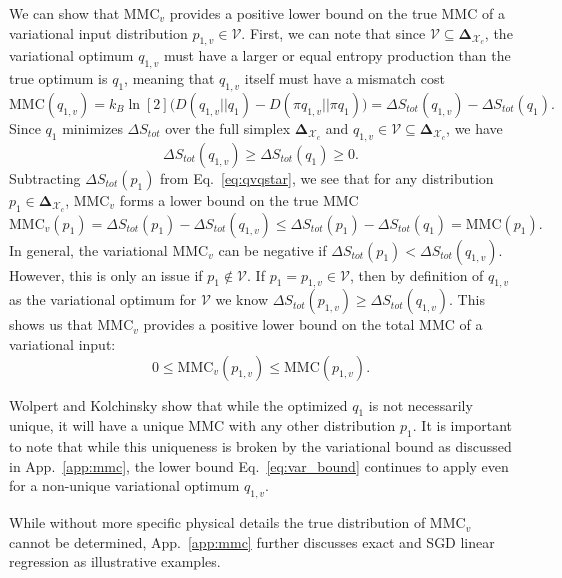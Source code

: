 \documentclass[12pt,onecolumn, margin=1in]{IEEEtran}
\newcommand{\compsimplex}{\boldsymbol{\Delta}_{\mathcal{X}_c}}
\begin{document}
We can show that MMC$_v$ provides a positive lower bound on the true MMC of a variational input distribution $p_{1,v} \in \mathcal{V}$. First, we can note that since $\mathcal{V} \subseteq \compsimplex$, the variational optimum $q_{1,v}$ must have a larger or equal entropy production than the true optimum is $q_1$, meaning that $q_{1,v}$ itself must have a mismatch cost
\begin{equation}
    \text{MMC}(q_{1,v}) = k_B \ln [2] \big (D(q_{1,v}||q_1) - D(\pi q_{1,v}||\pi q_1) \big) = \Delta S_{tot}(q_{1,v}) - \Delta S_{tot}(q_1).
\end{equation}
Since $q_1$ minimizes $\Delta S_{tot}$ over the full simplex $\compsimplex$ and $q_{1,v} \in \mathcal{V} \subseteq \compsimplex$, we have
\begin{equation}
    \label{eq:qvqstar}
    \Delta S_{tot}(q_{1,v}) \geq \Delta S_{tot}(q_1) \geq 0.
\end{equation}
Subtracting $\Delta S_{tot}(p_1)$ from Eq.~\eqref{eq:qvqstar}, we see that for any distribution $p_1 \in \compsimplex$, MMC$_v$ forms a lower bound on the true MMC
\begin{equation}
    \text{MMC}_v(p_1) = \Delta S_{tot}(p_1) - \Delta S_{tot}(q_{1,v}) \leq \Delta S_{tot}(p_1) - \Delta S_{tot}(q_1) = \text{MMC}(p_1).
\end{equation}
In general, the variational MMC$_v$ can be negative if $\Delta S_{tot}(p_1) < \Delta S_{tot}(q_{1,v})$. However, this is only an issue if $p_1 \notin \mathcal{V}$. If $p_1 = p_{1,v} \in \mathcal{V}$, then by definition of $q_{1,v}$ as the variational optimum for $\mathcal{V}$ we know $\Delta S_{tot}(p_{1,v}) \geq \Delta S_{tot}(q_{1,v})$. This shows us that MMC$_v$ provides a positive lower bound on the total MMC of a variational input:
\begin{equation}
    \label{eq:var_bound}
    0 \leq \text{MMC}_v(p_{1,v}) \leq \text{MMC}(p_{1,v}).
\end{equation}

Wolpert and Kolchinsky show that while the optimized $q_1$ is not necessarily unique, it will have a unique MMC with any other distribution $p_1$\cite{Wolpert_2020}. It is important to note that while this uniqueness is broken by the variational bound as discussed in App.~\ref{app:mmc}, the lower bound Eq.~\eqref{eq:var_bound} continues to apply even for a non-unique variational optimum $q_{1,v}$. 

While without more specific physical details the true distribution of MMC$_v$ cannot be determined, App.~\ref{app:mmc} further discusses exact and SGD linear regression as illustrative examples.
\end{document}
